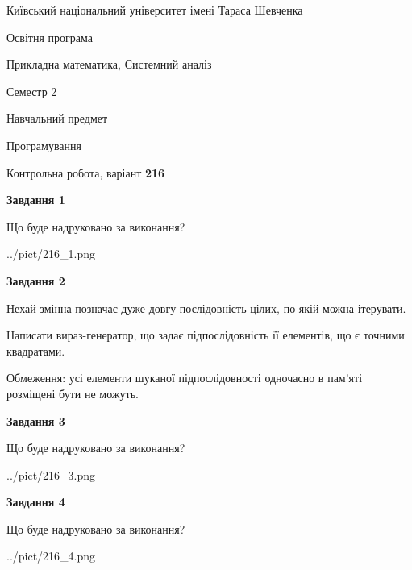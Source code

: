 \documentclass[12pt, ukrainian]{article}
\begin{document}
{{\begin {small}\par
{ \center  Київський національний університет імені Тараса Шевченка \par}
{\parbox {5 cm}{Освітня програма \hfill}{\parbox {8 cm}{Прикладна математика, Системний аналіз \hfill}}\parbox {5 cm}{\hfill Семестр 2}}\par
{\parbox {5 cm} {Навчальний предмет \hfill}\parbox {7 cm}{Програмування \hfill}\parbox {6cm}{\hfill}\par}\vspace{-7pt} \end{small}}{\center Контрольна робота, варіант  \No \textbf
{ 216 }\par}}
{
\begin {large}
{\begin {center}\textbf{Завдання 1}\end {center}}\par
Що буде надруковано за виконання?\par\par
\begin{center}
	{../pict/216_1.png}
\end{center}
\newpage

{\begin {center}\textbf{Завдання 2}\end {center}}\par
Нехай змінна  позначає дуже довгу послідовність цілих, по якій можна ітерувати.

Написати вираз-генератор, що задає підпослідовність її елементів, що є точними квадратами.

Обмеження: усі елементи шуканої підпослідовності одночасно в пам'яті розміщені бути не можуть.\par
\newpage

{\begin {center}\textbf{Завдання 3}\end {center}}\par
Що буде надруковано за виконання?\par
\begin{center}
	{../pict/216_3.png}
\end{center}
\newpage

{\begin {center}\textbf{Завдання 4}\end {center}}\par
Що буде надруковано за виконання?\par
\begin{center}
	{../pict/216_4.png}
\end{center}
\newpage


\end{large}}
\end{document}
